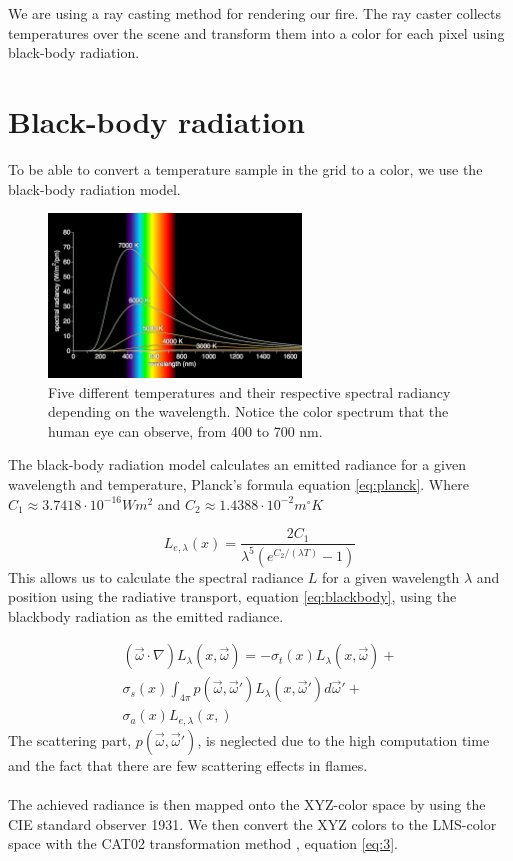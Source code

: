 We are using a ray casting method for rendering our fire. The ray caster collects temperatures over the scene and transform them into a color for each pixel using black-body radiation.
\section{Black-body radiation}
	To be able to convert a temperature sample in the grid to a color, we use the black-body radiation model. 


\begin{figure}[h!]
\label{fig:blackbody}
\centering
\includegraphics[width=0.6\textwidth]{blackbody.png}
\caption{Five different temperatures and their respective spectral radiancy depending on the wavelength. Notice the color spectrum that the human eye can observe, from 400 to 700 nm.}
\end{figure}

The black-body radiation model calculates an emitted radiance for a given wavelength and temperature, Planck's formula\cite{Nguyen02} equation \ref{eq:planck}. Where $C_1 \approx 3.7418 \cdot 10^{-16} Wm^2$ and $C_2 \approx 1.4388 \cdot 10^{-2} m^\circ K$

\begin{equation}
\label{eq:planck}
	L_{e,\lambda}(x) = \frac{2C_1}{\lambda^5(e^{C_2/(\lambda T)}-1)}
\end{equation}
This allows us to calculate the spectral radiance $L$ for a given wavelength $\lambda$ and position using the radiative transport, equation \ref{eq:blackbody}, using the blackbody radiation as the emitted radiance. 

\begin{equation}
\label{eq:blackbody}
\begin{split}
	(\vec{\omega}\cdot \nabla)L_\lambda(x,\vec{\omega}) = -\sigma_t(x)L_\lambda(x,\vec{\omega}) + \\ 
\sigma_s(x) \int_{4\pi} p(\vec{\omega},\vec{\omega}')L_\lambda(x,\vec{\omega}')d\vec{\omega}' + \\
\sigma_a(x)L_{e,\lambda}(x,)
\end{split}
\end{equation}
The scattering part, $ p(\vec{\omega},\vec{\omega}')$,  is neglected due to the high computation time and the fact that there are few scattering effects in flames. \\\\
The achieved radiance is then mapped onto the XYZ-color space by using the CIE standard observer 1931\cite{CIE}.
We then convert the XYZ colors to the LMS-color space with the CAT02 transformation method \cite{CAT02}, equation \ref{eq:3}.


